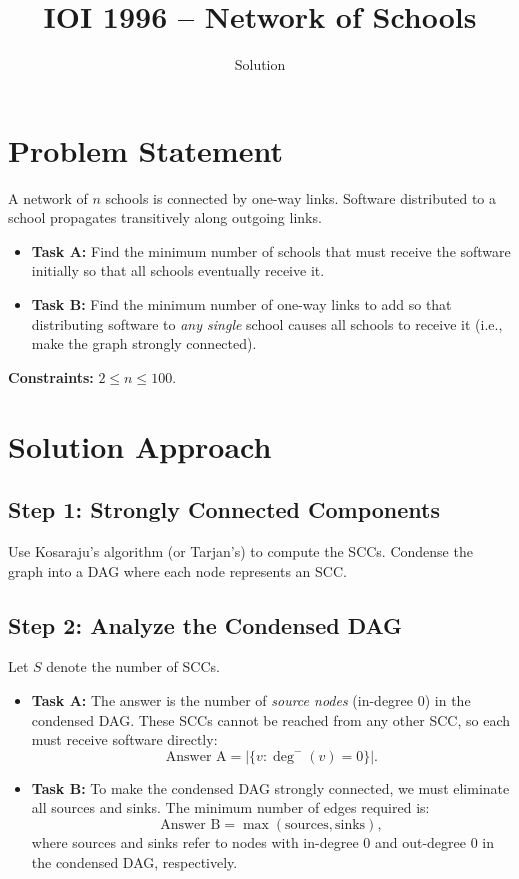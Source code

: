 \documentclass[11pt,a4paper]{article}
\title{IOI 1996 -- Network of Schools}
\author{Solution}
\date{}
\begin{document}
\maketitle

\section{Problem Statement}

A network of $n$ schools is connected by one-way links. Software distributed to a school
propagates transitively along outgoing links.

\begin{itemize}
  \item \textbf{Task A:} Find the minimum number of schools that must receive the software
    initially so that all schools eventually receive it.
  \item \textbf{Task B:} Find the minimum number of one-way links to add so that
    distributing software to \emph{any single} school causes all schools to receive it
    (i.e., make the graph strongly connected).
\end{itemize}

\noindent\textbf{Constraints:} $2 \le n \le 100$.

\section{Solution Approach}

\subsection{Step 1: Strongly Connected Components}

Use Kosaraju's algorithm (or Tarjan's) to compute the SCCs. Condense the graph into a
DAG where each node represents an SCC.

\subsection{Step 2: Analyze the Condensed DAG}

Let $S$ denote the number of SCCs.

\begin{itemize}
  \item \textbf{Task A:} The answer is the number of \emph{source nodes}
    (in-degree 0) in the condensed DAG. These SCCs cannot be reached from any
    other SCC, so each must receive software directly:
    \[
      \text{Answer A} = |\{v : \deg^-(v) = 0\}|.
    \]

  \item \textbf{Task B:} To make the condensed DAG strongly connected, we must
    eliminate all sources and sinks. The minimum number of edges required is:
    \[
      \text{Answer B} = \max(\text{sources}, \text{sinks}),
    \]
    where sources and sinks refer to nodes with in-degree 0 and out-degree 0
    in the condensed DAG, respectively.
\end{itemize}
\end{document}
